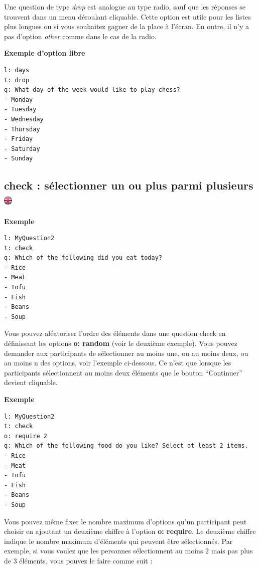 \documentclass[
]{book}
\begin{document}
Une question de type \emph{drop} est analogue au type radio, sauf que les réponses se trouvent dans un menu déroulant cliquable. Cette option est utile pour les listes plus longues ou si vous souhaitez gagner de la place à l'écran. En outre, il n'y a pas d'option \emph{other} comme dans le cas de la radio.

\textbf{Exemple d'option libre}

\begin{verbatim}
l: days
t: drop
q: What day of the week would like to play chess?
- Monday
- Tuesday
- Wednesday
- Thursday
- Friday
- Saturday
- Sunday
\end{verbatim}

\hypertarget{check-suxe9lectionner-un-ou-plus-parmi-plusieurs}{%
\subsection[check : sélectionner un ou plus parmi plusieurs ]{\texorpdfstring{check : sélectionner un ou plus parmi plusieurs \href{https://www.psytoolkit.org/doc3.4.0/online-survey-syntax.html\#check}{\protect\includegraphics{img/ukflag.png}}}{check : sélectionner un ou plus parmi plusieurs }}\label{check-suxe9lectionner-un-ou-plus-parmi-plusieurs}}

\textbf{Exemple}

\begin{verbatim}
l: MyQuestion2
t: check
q: Which of the following did you eat today?
- Rice
- Meat
- Tofu
- Fish
- Beans
- Soup
\end{verbatim}

Vous pouvez aléatoriser l'ordre des éléments dans une question check en définissant les options \textbf{o: random} (voir le deuxième exemple). Vous pouvez demander aux participants de sélectionner au moins une, ou au moins deux, ou au moins n des options, voir l'exemple ci-dessous. Ce n'est que lorsque les participants sélectionnent au moins deux éléments que le bouton ``Continuer'' devient cliquable.

\textbf{Exemple}

\begin{verbatim}
l: MyQuestion2
t: check
o: require 2
q: Which of the following food do you like? Select at least 2 items.
- Rice
- Meat
- Tofu
- Fish
- Beans
- Soup
\end{verbatim}

Vous pouvez même fixer le nombre maximum d'options qu'un participant peut choisir en ajoutant un deuxième chiffre à l'option \textbf{o: require}. Le deuxième chiffre indique le nombre maximum d'éléments qui peuvent être sélectionnés. Par exemple, si vous voulez que les personnes sélectionnent au moins 2 mais pas plus de 3 éléments, vous pouvez le faire comme suit :
\end{document}
